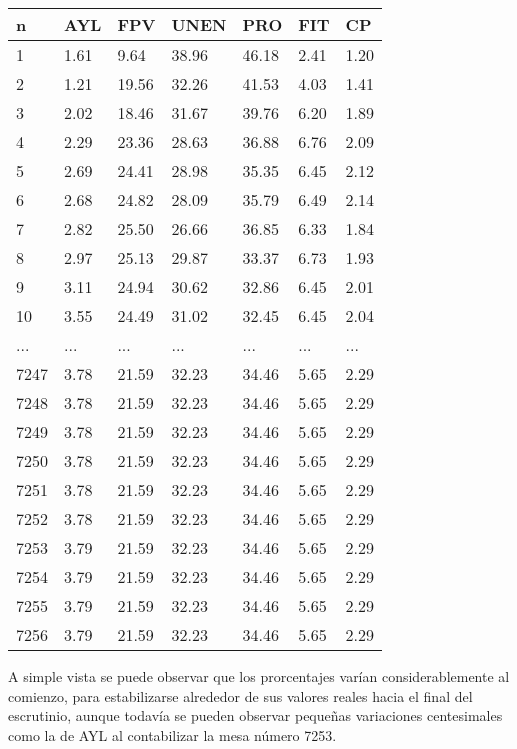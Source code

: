 \documentclass[12pt, a4paper]{article}
\begin{document}
\begin{center}
	\begin{tabular}{l | llllll}
n & AYL & FPV & UNEN & PRO & FIT & CP \\ \hline
1 & 1.61 & 9.64 & 38.96 & 46.18 & 2.41 & 1.20 \\
2 & 1.21 & 19.56 & 32.26 & 41.53 & 4.03 & 1.41 \\
3 & 2.02 & 18.46 & 31.67 & 39.76 & 6.20 & 1.89 \\
4 & 2.29 & 23.36 & 28.63 & 36.88 & 6.76 & 2.09 \\
5 & 2.69 & 24.41 & 28.98 & 35.35 & 6.45 & 2.12 \\
6 & 2.68 & 24.82 & 28.09 & 35.79 & 6.49 & 2.14 \\
7 & 2.82 & 25.50 & 26.66 & 36.85 & 6.33 & 1.84 \\
8 & 2.97 & 25.13 & 29.87 & 33.37 & 6.73 & 1.93 \\
9 & 3.11 & 24.94 & 30.62 & 32.86 & 6.45 & 2.01 \\
10 & 3.55 & 24.49 & 31.02 & 32.45 & 6.45 & 2.04 \\
... & ... & ... & ... & ... & ... & ...  \\
7247 & 3.78 & 21.59 & 32.23 & 34.46 & 5.65 & 2.29 \\
7248 & 3.78 & 21.59 & 32.23 & 34.46 & 5.65 & 2.29 \\
7249 & 3.78 & 21.59 & 32.23 & 34.46 & 5.65 & 2.29 \\
7250 & 3.78 & 21.59 & 32.23 & 34.46 & 5.65 & 2.29 \\
7251 & 3.78 & 21.59 & 32.23 & 34.46 & 5.65 & 2.29 \\
7252 & 3.78 & 21.59 & 32.23 & 34.46 & 5.65 & 2.29 \\
7253 & 3.79 & 21.59 & 32.23 & 34.46 & 5.65 & 2.29 \\
7254 & 3.79 & 21.59 & 32.23 & 34.46 & 5.65 & 2.29 \\
7255 & 3.79 & 21.59 & 32.23 & 34.46 & 5.65 & 2.29 \\
7256 & 3.79 & 21.59 & 32.23 & 34.46 & 5.65 & 2.29 \\
	\end{tabular}
\end{center}

A simple vista se puede observar que los prorcentajes var\'ian considerablemente al comienzo, para estabilizarse alrededor de sus valores reales hacia el final del escrutinio, aunque todav\'ia se pueden observar peque\~nas variaciones centesimales como la de AYL al contabilizar la mesa n\'umero 7253.
\end{document}
